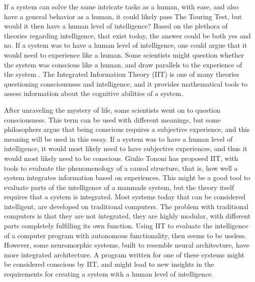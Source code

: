 If a system can solve the same intricate tasks as a human, with ease, and also have a general behavior as a human,
it could likely pass The Touring Test, but would it then have a human level of intelligence?
Based on the plethora of theories regarding intelligence, that exist today, the answer could be both yes and no.
If a system was to have a human level of intelligence, one could argue that it would need to experience like a human.
Some scientists might question whether the system was conscious like a human, and draw parallels to the experience of the system \cite{tononi_iit3}.
The Integrated Information Theory (IIT) is one of many theories questioning consciousness and intelligence, and it provides mathematical tools
to assess information about the cognitive abilities of a system.

After unraveling the mystery of life, some scientists went on to question consciousness.
This term can be used with different meanings, but some philosophers argue that being conscious requires a subjective experience, and this meaning will be used in this essay.
If a system was to have a human level of intelligence, it would most likely need to have subjective experiences, and thus it would most likely need to be conscious.
Giulio Tononi has proposed IIT, with tools to evaluate the phenomenology of a causal structure, that is,
how well a system integrates information based on experiences. This might be a good tool to evaluate parts of the intelligence of a manmade system,
but the theory itself requires that a system is integrated. Most systems today that can be considered intelligent, are developed on traditional computers.
The problem with traditional computers is that they are not integrated, they are highly modular, with different parts completely fulfilling its own function.
Using IIT to evaluate the intelligence of a computer program with autonomous functionality, then seems to be useless.
However, some neuromorphic systems, built to resemble neural architecture, have more integrated architecture.
A program written for one of these systems might be considered conscious by IIT, and might lead to new insights in the requirements for creating a system with a human level of intelligence.
